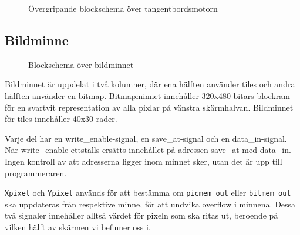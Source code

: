 \documentclass[]{article}
\begin{document}
\begin{figure}[h!]
	\caption{Övergripande blockschema över tangentbordsmotorn}
\end{figure}

\subsection{Bildminne}
\begin{figure}[h!]
	\caption{Blockschema över bildminnet}
\end{figure}

Bildminnet är uppdelat i två kolumner, där ena hälften använder tiles och andra hälften använder en bitmap. Bitmapminnet innehåller 320x480 bitars blockram för en svartvit representation av alla pixlar på vänstra skärmhalvan. Bildminnet för tiles innehåller 40x30 rader.

Varje del har en write\_enable-signal, en save\_at-signal och en data\_in-signal. När write\_enable ettställs ersätts innehållet på adressen save\_at med data\_in. Ingen kontroll av att adresserna ligger inom minnet sker, utan det är upp till programmeraren.

\label{parag:picmempixel}
\texttt{Xpixel} och \texttt{Ypixel} används för att bestämma om \texttt{picmem\_out} eller \texttt{bitmem\_out} ska uppdateras från respektive minne, för att undvika overflow i minnena. Dessa två signaler innehåller alltså värdet för pixeln som ska ritas ut, beroende på vilken hälft av skärmen vi befinner oss i.
\end{document}
